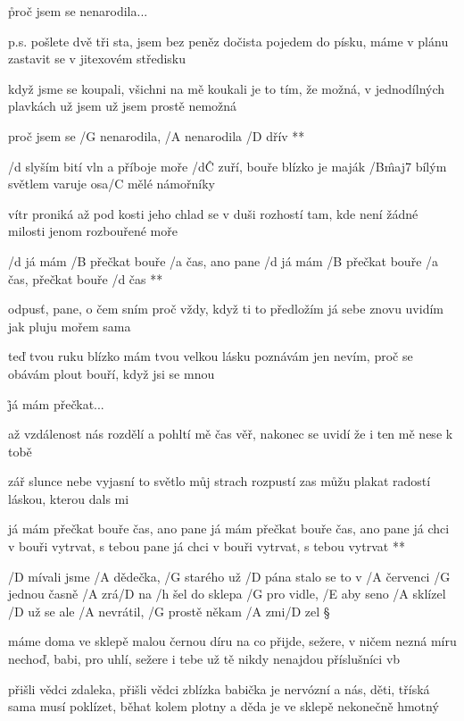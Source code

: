 \r proč jsem se nenarodila...

p.s. pošlete dvě tři sta, jsem bez peněz dočista
pojedem do písku, máme v plánu zastavit se
v jitexovém středisku \s

když jsme se koupali, všichni na mě koukali
je to tím, že možná, v jednodílných plavkách už jsem
už jsem prostě nemožná

\R  proč jsem se /G nenarodila, /A nenarodila /D dřív **




/d slyším bití vln a příboje
moře /d\^C zuří, bouře blízko je
maják /B\^{maj7} bílým světlem varuje
osa/C mělé námořníky \s

vítr proniká až pod kosti
jeho chlad se v duši rozhostí
tam, kde není žádné milosti
jenom rozbouřené moře

\R /d já mám /B přečkat bouře /a čas, ano pane
   /d já mám /B přečkat bouře /a čas, přečkat bouře /d čas **

odpusť, pane, o čem sním
proč vždy, když ti to předložím
já sebe znovu uvidím
jak pluju mořem sama \s

teď tvou ruku blízko mám
tvou velkou lásku poznávám
jen nevím, proč se obávám
plout bouří, když jsi se mnou

\r já mám přečkat...

až vzdálenost nás rozdělí
a pohltí mě čas
věř, nakonec se uvidí
že i ten mě nese k tobě \s

zář slunce nebe vyjasní
to světlo můj strach rozpustí
zas můžu plakat radostí
láskou, kterou dals mi

\R já mám přečkat bouře čas, ano pane
   já mám přečkat bouře čas, ano pane
   já chci v bouři vytrvat, s tebou pane
   já chci v bouři vytrvat, s tebou vytrvat **




/D mívali jsme /A dědečka, /G starého už /D pána
stalo se to v /A červenci /G jednou časně /A zrá/D na
/h šel do sklepa /G pro vidle, /E aby seno /A sklízel
/D už se ale /A nevrátil, /G prostě někam /A zmi/D zel \S

máme doma ve sklepě malou černou díru
na co přijde, sežere, v ničem nezná míru
nechoď, babi, pro uhlí, sežere i tebe
už tě nikdy nenajdou příslušníci vb \s

přišli vědci zdaleka, přišli vědci zblízka
babička je nervózní a nás, děti, tříská
sama musí poklízet, běhat kolem plotny
a děda je ve sklepě nekonečně hmotný \s

